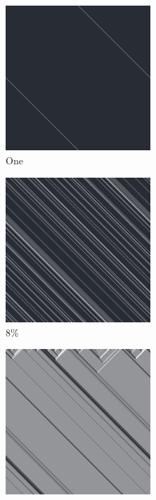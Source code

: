\documentclass[12pt, fleqn]{report}                             %
\theoremstyle{break}                                            %
\begin{document}
      \begin{figure}[ht!]
        \centering
        \begin{subfigure}[b]{0.4\linewidth}
          \includegraphics[width=0.6\textwidth]{Images/184/a.png}
          \caption{One}
        \end{subfigure}
        \begin{subfigure}[b]{0.4\linewidth}
          \includegraphics[width=0.6\textwidth]{Images/184/b.png}
          \caption{8\%}
        \end{subfigure}
        \begin{subfigure}[b]{0.4\linewidth}
          \includegraphics[width=0.6\textwidth]{Images/184/c.png}

\end{subfigure}
\end{figure}
\end{document}
